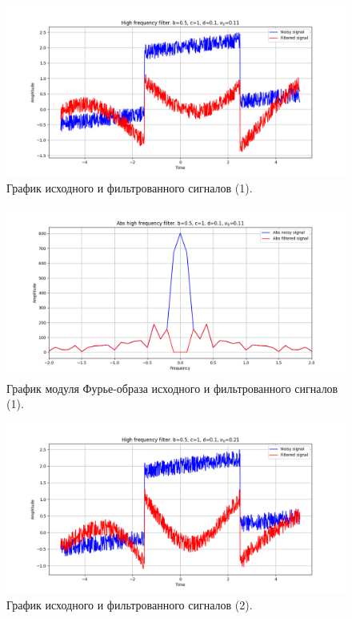 \documentclass[a4paper, 12pt]{article}
\begin{document}
    \begin{figure}[!htb]
        \centering
        \includegraphics[scale=0.48]{1_u_flt_u_nolow.png}
        \captionsetup{skip=0pt}
        \caption{График исходного и фильтрованного сигналов (1).}
        \label{fig:fig27}
    \end{figure}
    \newpage
    \begin{figure}[!htb]
        \centering
        \includegraphics[scale=0.48]{1_abs_u_U_nolow.png}
        \captionsetup{skip=0pt}
        \caption{График модуля Фурье-образа исходного и фильтрованного сигналов (1).}
        \label{fig:fig28}
    \end{figure}
    \begin{figure}[!htb]
        \centering
        \includegraphics[scale=0.48]{2_u_flt_u_nolow.png}
        \captionsetup{skip=0pt}
        \caption{График исходного и фильтрованного сигналов (2).}
        \label{fig:fig29}
    \end{figure}
\end{document}
